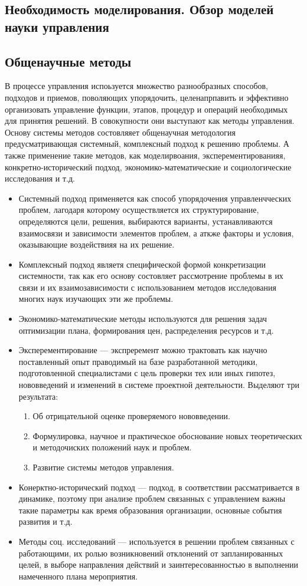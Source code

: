 \documentclass[a4paper,12pt,oneside,final]{extarticle}
\numberwithin{equation}{section}
\begin{document}
\subsection{Необходимость моделирования. Обзор моделей науки управления}

\subsection{Общенаучные методы}
В процессе управления испоьзуется множество разнообразных способов, подходов и приемов, поволяющих упорядочить, целенапрпавить и эффективно организовать управление функции, этапов, процедур и операций необходимых для принятия решений. 
В совокупности они выступают как методы управления. 
Основу системы методов состовляяет общенаучная методология предусматривающая системный, комплексный подход к решению проблемы. 
А также применение такие методов, как моделирвоания, эксперементированияя, конкретно-исторический подход, экономико-математические и социологические исследования и т.д.
\begin{itemize}
	\item Системный подход применяется как способ упорядочения управленчческих проблем, лагодаря которому осуществляется их структурирование, определяются цели, решения, выбираются варианты, устанавливаются взаимосвязи и зависимости элементов проблем, а аткже факторы и условия, оказывающие воздействияя на их решение.
	\item Комплексный подход являетя специфической формой конкретизации системности, так как его основу состовляет рассмотрение проблемы в их связи и их взаимозависимости с использованием методов исследования многих наук изучающих эти же проблемы. 
	\item Экономико-математические методы используются для решения задач оптимизации плана, формирования цен, распределения ресурсов и т.д.
	\item Эксперементирование --- экспреремент можно трактовать как научно поставленный опыт праводимый на базе разработанной методики, подготовленной специалистами с цель проверки тех или иных гипотез, нововведений и изменений в системе проектной деятельности. 
	Выделяют три результата:
	\begin{enumerate} 
		\item Об отрицательной оценке проверяемого нововведении.
		\item Формулировка, научное и практическое обоснование новых теоретических и методочиских положений наук и проблем. 
		\item Развитие системы методов управления.
	\end{enumerate}
	\item Конерктно-исторический подход --- подход, в соответствии рассматривается в динамике, поэтому при анализе проблем связанных с управлением важны такие параметры как время образования организации, основные события развития и т.д.
	\item Методы соц. исследований --- используется в решении проблем связанных с работающими, их ролью возникновений отклонений от запланированных целей, в выборе направления действий и заинтересованностью в выполнении намеченного плана мероприятия. 
\end{itemize}
\end{document}

